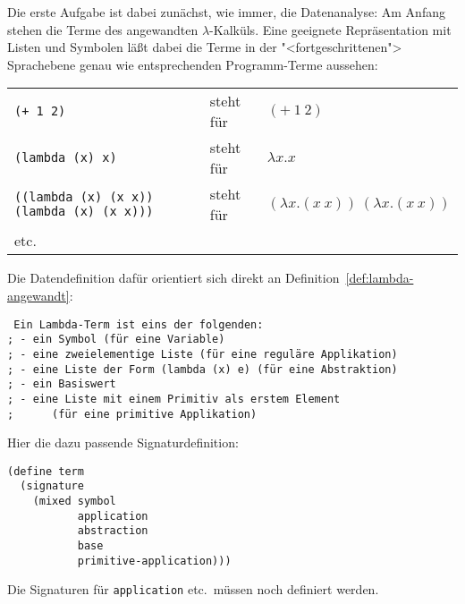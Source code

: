 Die erste Aufgabe ist dabei zunächst, wie immer, die Datenanalyse: Am
Anfang stehen die Terme des angewandten $\lambda$-Kalküls.  Eine
geeignete Repräsentation mit Listen und Symbolen läßt dabei die Terme
in der "<fortgeschrittenen"> Sprachebene genau wie entsprechenden
Programm-Terme aussehen:

\noindent\begin{tabular}{lll}
  \texttt{(+ 1 2)} & steht für & $(+~1~2)$\\
  \texttt{(lambda (x) x)} & steht für & $\lambda x.x$\\
  \texttt{((lambda (x) (x x)) (lambda (x) (x x)))} & steht für &
  $(\lambda x.(x~x))~(\lambda x.(x~x))$\\
  etc.
\end{tabular}

Die Datendefinition dafür orientiert sich direkt an
Definition~\ref{def:lambda-angewandt}:
%
\begin{verbatim}
 Ein Lambda-Term ist eins der folgenden:
; - ein Symbol (für eine Variable)
; - eine zweielementige Liste (für eine reguläre Applikation)
; - eine Liste der Form (lambda (x) e) (für eine Abstraktion)
; - ein Basiswert
; - eine Liste mit einem Primitiv als erstem Element
;      (für eine primitive Applikation)
\end{verbatim}
%
Hier die dazu passende Signaturdefinition:
%
\begin{verbatim}
(define term
  (signature
    (mixed symbol
           application
           abstraction
           base
           primitive-application)))
\end{verbatim}
%
Die Signaturen für \texttt{application} etc.\ müssen noch definiert
werden.

